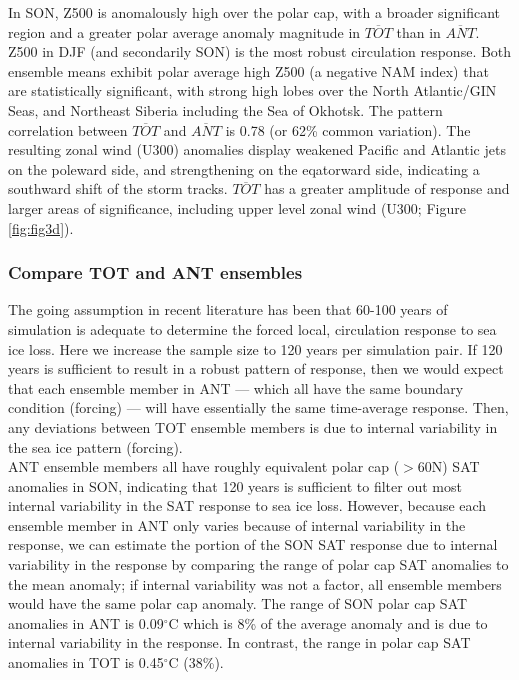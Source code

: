 \documentclass[twocol]{ametsoc}
\begin{document}
In SON, Z500 is anomalously high over the polar cap, with a broader significant region and a greater polar average anomaly magnitude in $\overline{TOT}$ than in $\overline{ANT}$. \\

Z500 in DJF (and secondarily SON) is the most robust circulation response. Both ensemble means exhibit polar average high Z500 (a negative NAM index) that are statistically significant, with strong high lobes over the North Atlantic/GIN Seas, and Northeast Siberia including the Sea of Okhotsk. The pattern correlation between $\overline{TOT}$ and $\overline{ANT}$ is 0.78 (or 62\% common variation). The resulting zonal wind (U300) anomalies display weakened Pacific and Atlantic jets on the poleward side, and strengthening on the eqatorward side, indicating a southward shift of the storm tracks. $\overline{TOT}$ has a greater amplitude of response and larger areas of significance, including upper level zonal wind (U300; Figure \ref{fig:fig3d}).\\ 

\subsubsection{Compare TOT and ANT ensembles}
The going assumption in recent literature has been that 60-100 years of simulation is adequate to determine the forced local, circulation response to sea ice loss. Here we increase the sample size to 120 years per simulation pair. If 120 years is sufficient to result in a robust pattern of response, then we would expect that each ensemble member in ANT --- which all have the same boundary condition (forcing) --- will have essentially the same time-average response. Then, any deviations between TOT ensemble members is due to internal variability in the sea ice pattern (forcing).\\

ANT ensemble members all have roughly equivalent polar cap ($>$60N) SAT anomalies in SON, indicating that 120 years is sufficient to filter out most internal variability in the SAT response to sea ice loss. However, because each ensemble member in ANT only varies because of internal variability in the response, we can estimate the portion of the SON SAT response due to internal variability in the response by comparing the range of polar cap SAT anomalies to the mean anomaly; if internal variability was not a factor, all ensemble members would have the same polar cap anomaly. The range of SON polar cap SAT anomalies in ANT is 0.09$^\circ$C which is 8\% of the average anomaly and is due to internal variability in the response. In contrast, the range in polar cap SAT anomalies in TOT is 0.45$^\circ$C (38\%).\\
\end{document}
